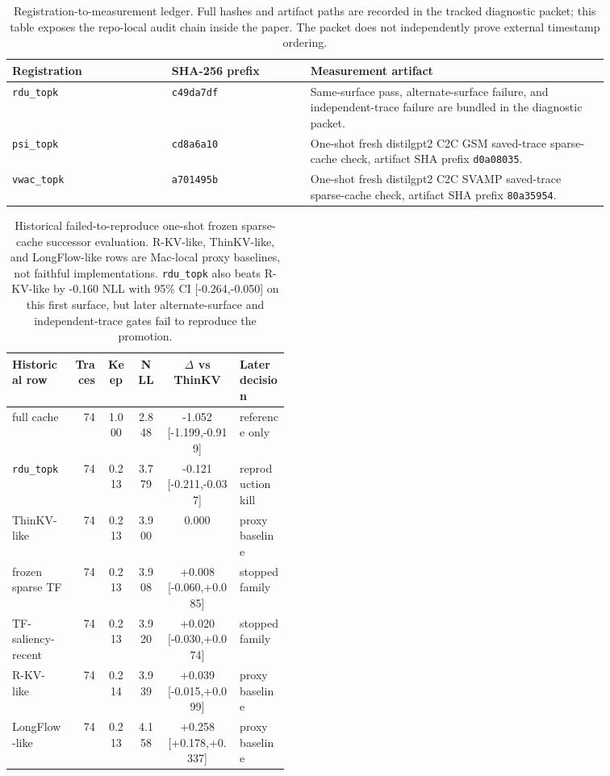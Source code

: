 \documentclass{article}
\begin{document}
\begin{table}[h]
\centering
\small
\begin{tabular}{p{0.23\linewidth}p{0.20\linewidth}p{0.43\linewidth}}
\toprule
Registration & SHA-256 prefix & Measurement artifact \\
\midrule
\texttt{rdu\_topk} & \texttt{c49da7df} & Same-surface pass, alternate-surface failure, and independent-trace failure are bundled in the diagnostic packet. \\
\texttt{psi\_topk} & \texttt{cd8a6a10} & One-shot fresh distilgpt2 C2C GSM saved-trace sparse-cache check, artifact SHA prefix \texttt{d0a08035}. \\
\texttt{vwac\_topk} & \texttt{a701495b} & One-shot fresh distilgpt2 C2C SVAMP saved-trace sparse-cache check, artifact SHA prefix \texttt{80a35954}. \\
\bottomrule
\end{tabular}
\caption{Registration-to-measurement ledger. Full hashes and artifact paths are
recorded in the tracked diagnostic packet; this table exposes the repo-local
audit chain inside the paper. The packet does not independently prove external
timestamp ordering.}
\end{table}

\begin{table}[h]
\centering
\scriptsize
\setlength{\tabcolsep}{2pt}
\begin{tabular}{@{}p{0.22\linewidth}rcccp{0.18\linewidth}@{}}
\toprule
Historical row & Traces & Keep & NLL & $\Delta$ vs ThinKV & Later decision \\
\midrule
full cache & 74 & 1.000 & 2.848 & -1.052 [-1.199,-0.919] & reference only \\
\texttt{rdu\_topk} & 74 & 0.213 & 3.779 & -0.121 [-0.211,-0.037] & reproduction kill \\
ThinKV-like & 74 & 0.213 & 3.900 & 0.000 & proxy baseline \\
frozen sparse TF & 74 & 0.213 & 3.908 & +0.008 [-0.060,+0.085] & stopped family \\
TF-saliency-recent & 74 & 0.213 & 3.920 & +0.020 [-0.030,+0.074] & stopped family \\
R-KV-like & 74 & 0.214 & 3.939 & +0.039 [-0.015,+0.099] & proxy baseline \\
LongFlow-like & 74 & 0.213 & 4.158 & +0.258 [+0.178,+0.337] & proxy baseline \\
\bottomrule
\end{tabular}
\caption{Historical failed-to-reproduce one-shot frozen sparse-cache successor evaluation. R-KV-like, ThinKV-like, and LongFlow-like rows are Mac-local proxy baselines, not faithful implementations. \texttt{rdu\_topk} also beats R-KV-like by -0.160 NLL with 95\% CI [-0.264,-0.050] on this first surface, but later alternate-surface and independent-trace gates fail to reproduce the promotion.}
\end{table}
\end{document}
